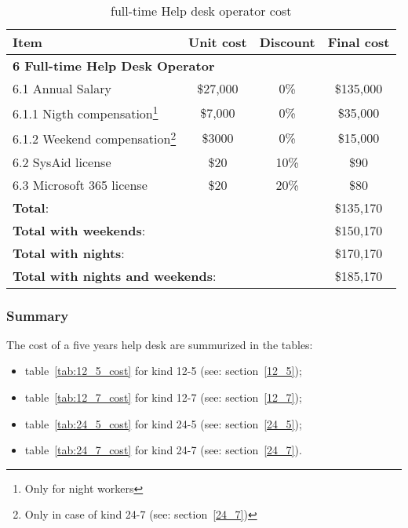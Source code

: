 \begin{minipage}{15cm}
	\begin{table}[H]
		\centering
		\begin{tabular}{|l|c|c|c|} 
			\hline
			\textbf{Item} & \textbf{Unit cost} & \textbf{Discount} & \textbf{Final cost}   \\
			\hline
			\multicolumn{4}{|l|}{\textbf{6 Full-time Help Desk Operator}}\\
			\hline
			\hspace{2mm}6.1  Annual Salary & \$27,000 & 0\% & \$135,000\\
			\hline
			\hspace{4mm}6.1.1 Nigth compensation\footnote{Only for night workers} & \$7,000 & 0\% & \$35,000 \\
			\hline
			\hspace{4mm}6.1.2 Weekend compensation\footnote{Only in case of kind 24{-}7 (see: section~\ref{24_7})}& \$3000 & 0\% & \$15,000 \\
			\hline
			\hspace{2mm}6.2 SysAid license & \$20 & 10\% & \$90 \\
			\hline
			\hspace{2mm}6.3 Microsoft 365 license  & \$20 & 20\% & \$80 \\
			\hline
			\multicolumn{3}{|l|}{\textbf{Total}:} & \$135,170\\
			\hline
			\multicolumn{3}{|l|}{\textbf{Total with weekends}:} & \$150,170\\
			\hline
			\multicolumn{3}{|l|}{\textbf{Total with nights}:} & \$170,170\\
			\hline
			\multicolumn{3}{|l|}{\textbf{Total with nights and weekends}:} & \$185,170\\
			\hline
		\end{tabular}
		\caption{full-time Help desk operator cost}\label{tab:full_time_operator_cost}
	\end{table}
\end{minipage}

\subsubsection{Summary}
The cost of a five years help desk are summurized in the tables:
\begin{itemize}
	\item table~\ref{tab:12_5_cost} for kind 12{-}5 (see: section~\ref{12_5});
	\item table~\ref{tab:12_7_cost} for kind 12{-}7 (see: section~\ref{12_7});
	\item table~\ref{tab:24_5_cost} for kind 24{-}5 (see: section~\ref{24_5});
	\item table~\ref{tab:24_7_cost} for kind 24{-}7 (see: section~\ref{24_7}).
\end{itemize}


